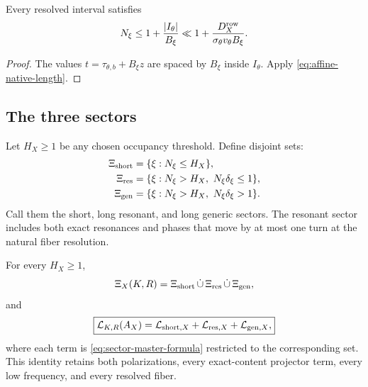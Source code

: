 \begin{proposition}
\label{prop:resolved-occupancy}
Every resolved interval satisfies
\begin{equation}
 N_\xi
 \le
 1+\frac{|I_\theta|}{B_\xi}
 \ll
 1+\frac{D_X^{\rm row}}
 {\sigma_\theta v_\theta B_\xi}.
\label{eq:resolved-occupancy}
\end{equation}
\end{proposition}

\begin{proof}
The values \(t=\tau_{\theta,b}+B_\xi z\) are spaced by \(B_\xi\)
inside \(I_\theta\).  Apply
\eqref{eq:affine-native-length}.
\end{proof}

\subsection{The three sectors}

Let \(H_X\ge1\) be any chosen occupancy threshold.  Define disjoint
sets:
\begin{align}
 \Xi_{\mathrm{short}}
 &=
 \{\xi:N_\xi\le H_X\},
\label{eq:sector-short}\\
 \Xi_{\mathrm{res}}
 &=
 \{\xi:N_\xi>H_X,\ N_\xi\delta_\xi\le1\},
\label{eq:sector-resonant}\\
 \Xi_{\mathrm{gen}}
 &=
 \{\xi:N_\xi>H_X,\ N_\xi\delta_\xi>1\}.
\label{eq:sector-generic}
\end{align}
Call them the short, long resonant, and long generic sectors.
The resonant sector includes both exact resonances and phases that
move by at most one turn at the natural fiber resolution.

\begin{theorem}
\label{thm:complete-sector-decomposition}
For every \(H_X\ge1\),
\begin{equation}
 \Xi_X(K,R)
 =
 \Xi_{\mathrm{short}}\,\dot\cup\,
 \Xi_{\mathrm{res}}\,\dot\cup\,
 \Xi_{\mathrm{gen}},
\label{eq:sector-partition}
\end{equation}
and
\begin{equation}
 \boxed{
 \mathcal L_{K,R}(A_X)
 =
 \mathcal L_{\mathrm{short},X}
 +
 \mathcal L_{\mathrm{res},X}
 +
 \mathcal L_{\mathrm{gen},X},}
\label{eq:sector-sum}
\end{equation}
where each term is \eqref{eq:sector-master-formula} restricted to the
corresponding set.  This identity retains both polarizations, every
exact-content projector term, every low frequency, and every
resolved fiber.
\end{theorem}

